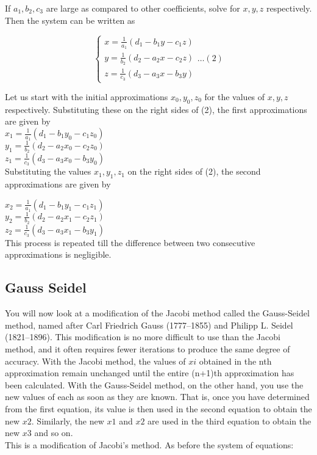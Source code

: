 If $a_1,b_2,c_3$ are large as compared to other coefficients, solve for $x,y,z$ respectively. Then the system can be written as

$$\begin{cases}x=\frac{1}{a_1}(d_1-b_1y-c_1z)\\y=\frac{1}{b_2}(d_2-a_2x-c_2z)\\z=\frac{1}{c_3}(d_3-a_3x-b_3y)\end{cases}\ldots(2)$$

Let us start with the initial approximations $x_0,y_0,z_0$ for the values of $x,y,z$ respectively. Substituting these on the right sides of (2), the first approximations are given by\\
\noindent $x_1=\frac{1}{a_1}(d_1-b_1y_0-c_1z_0)$\\
$y_1=\frac{1}{b_2}(d_2-a_2x_0-c_2z_0)$\\
$z_1=\frac{1}{c_3}(d_3-a_3x_0-b_3y_0)$\\

\noindent Substituting the values $x_1,y_1,z_1$ on the right sides of (2), the second approximations are given by

\noindent$x_2=\frac{1}{a_1}(d_1-b_1y_1-c_1z_1)$\\
$y_2=\frac{1}{b_2}(d_2-a_2x_1-c_2z_1)$\\
$z_2=\frac{1}{c_3}(d_3-a_3x_1-b_3y_1)$\\

\noindent This process is repeated till the difference between two consecutive approximations is negligible.
\
\
\subsection{Gauss Seidel}
You will now look at a modification of the Jacobi method called the Gauss-Seidel method, named  after  Carl  Friedrich  Gauss  (1777–1855)  and  Philipp  L.  Seidel  (1821–1896).  This modification is no more difficult to use than the Jacobi method, and it often requires fewer iterations to produce the same degree of accuracy.
With  the  Jacobi  method,  the  values  of $xi$ obtained  in  the  nth  approximation  remain unchanged  until  the  entire  (n+1)th  approximation  has  been  calculated.  
With  the  Gauss-Seidel  method, on  the  other  hand, you  use  the  new  values  of  each  as  soon  as  they  are known. That is, once you have determined from the first equation, its value is then used in  the  second  equation  to  obtain  the  new  $x2$.
Similarly,  the  new $x1$ and $x2$  are  used  in  
the  third  equation  to  obtain  the  new $x3$  and  so  on.\\
This is a modification of Jacobi's method. As before the system of equations:

